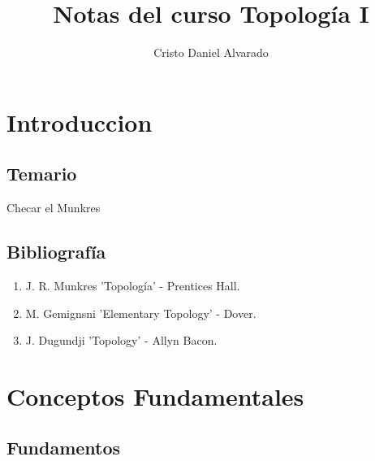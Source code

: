 \documentclass[12pt]{report}
\theoremstyle{largebreak}
\begin{document}
    \title{Notas del curso Topología I}
    \author{Cristo Daniel Alvarado}
    \maketitle

    \tableofcontents %

    \setcounter{chapter}{-1} %
    
    \chapter{Introduccion}
    
    \section{Temario}
    
    Checar el Munkres

    \section{Bibliografía}    

    \begin{enumerate}
        \item J. R. Munkres 'Topología' - Prentices Hall.
        \item M. Gemignsni 'Elementary Topology' -  Dover.
        \item J. Dugundji 'Topology' -  Allyn Bacon.
    \end{enumerate}

    \chapter{Conceptos Fundamentales}

    \section{Fundamentos}
\end{document}

